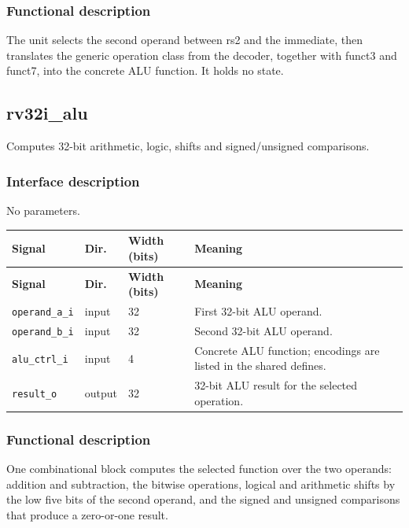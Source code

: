 \documentclass[11pt]{article}
\begin{document}
\subsubsection{Functional description}
\noindent The unit selects the second operand between rs2 and the immediate, then translates the generic operation class from the decoder, together with funct3 and funct7, into the concrete ALU function. It holds no state.\par\medskip

\subsection{rv32i\_alu}
Computes 32-bit arithmetic, logic, shifts and signed/unsigned comparisons.
\subsubsection{Interface description}
\noindent No parameters.\par\medskip
{\small
\begin{longtable}{@{}L{0.3400\dimexpr\linewidth-36pt\relax}L{0.1000\dimexpr\linewidth-36pt\relax}L{0.1000\dimexpr\linewidth-36pt\relax}L{0.4600\dimexpr\linewidth-36pt\relax}@{}}
\toprule
\textbf{Signal} & \textbf{Dir.} & \textbf{Width (bits)} & \textbf{Meaning} \\ \midrule
\endfirsthead
\toprule
\textbf{Signal} & \textbf{Dir.} & \textbf{Width (bits)} & \textbf{Meaning} \\ \midrule
\endhead
\texttt{operand\_a\_i} & input & 32 & First 32-bit ALU operand. \\ \addlinespace[3pt]
\texttt{operand\_b\_i} & input & 32 & Second 32-bit ALU operand. \\ \addlinespace[3pt]
\texttt{alu\_ctrl\_i} & input & 4 & Concrete ALU function; encodings are listed in the shared defines. \\ \addlinespace[3pt]
\texttt{result\_o} & output & 32 & 32-bit ALU result for the selected operation. \\*
\bottomrule\end{longtable}}
\subsubsection{Functional description}
\noindent One combinational block computes the selected function over the two operands: addition and subtraction, the bitwise operations, logical and arithmetic shifts by the low five bits of the second operand, and the signed and unsigned comparisons that produce a zero-or-one result.\par\medskip
\end{document}
